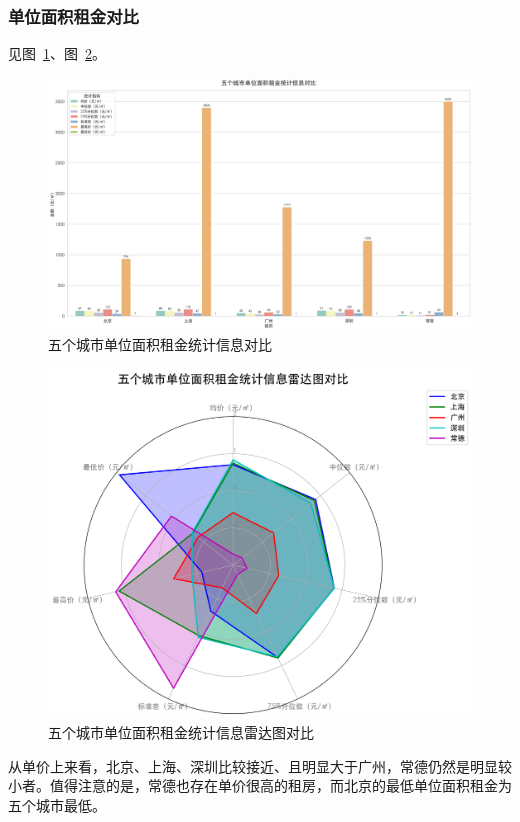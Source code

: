 \subsubsection{单位面积租金对比}
见图~\ref{fig:unit_price_bar_chart}、图~\ref{fig:unit_price_radar_chart}。
\begin{figure}[htbp]
    \centering
    \includegraphics[width=0.7\linewidth]{../../figure/unit_price_bar_chart.png}
    \caption{五个城市单位面积租金统计信息对比}
    \label{fig:unit_price_bar_chart}
\end{figure}
\begin{figure}[htbp]
    \centering
    \includegraphics[width=0.7\linewidth]{../../figure/unit_price_radar_chart.png}
    \caption{五个城市单位面积租金统计信息雷达图对比}
    \label{fig:unit_price_radar_chart}
\end{figure}

从单价上来看，北京、上海、深圳比较接近、且明显大于广州，常德仍然是明显较小者。值得注意的是，常德也存在单价很高的租房，而北京的最低单位面积租金为五个城市最低。

